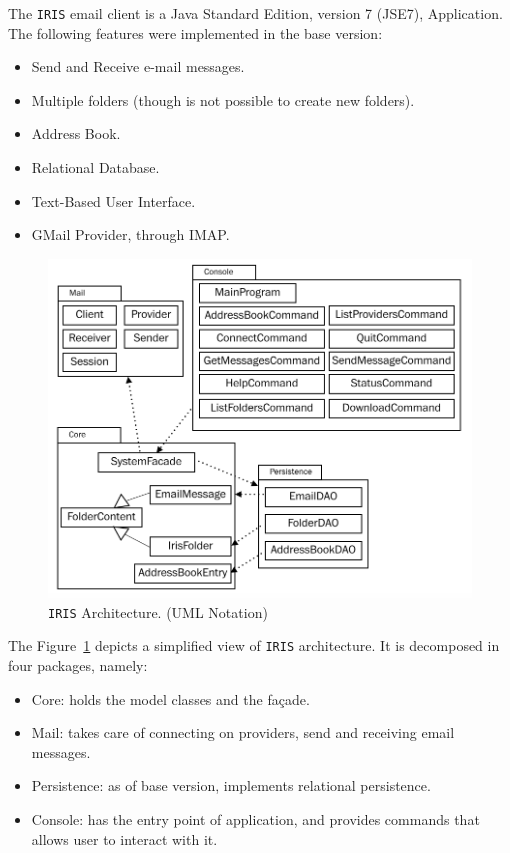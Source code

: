 %
%

The \texttt{IRIS} email client is a Java Standard Edition, version 7 (JSE7), Application. The following features were implemented in the base version:

\begin{itemize}
\item{Send and Receive e-mail messages.}
\item{Multiple folders (though is not possible to create new folders).}
\item{Address Book.}
\item{Relational Database.}
\item{Text-Based User Interface.}
\item{GMail Provider, through IMAP.}
\end{itemize}

\begin{figure}[!ht]
\centering
\includegraphics[width=4.5in]{case_study_fig_1.png}
\caption{\texttt{IRIS} Architecture. (UML Notation)}
\label{fig:case_study_fig1}
\end{figure}

The Figure~\ref{fig:case_study_fig1} depicts a simplified view of \texttt{IRIS} architecture. It is decomposed in four packages, namely:

\begin{itemize}
\item{Core: holds the model classes and the fa\c{c}ade.}
\item{Mail: takes care of connecting on providers, send and receiving email messages.}
\item{Persistence: as of base version, implements relational persistence.}
\item{Console: has the entry point of application, and provides commands that allows user to interact with it.}
\end{itemize}

